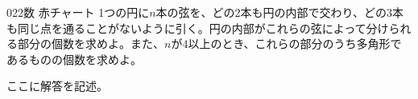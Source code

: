 \begin{prob}{022}{}{数 赤チャート}
 1つの円に$n$本の弦を、どの2本も円の内部で交わり、どの3本も同じ点を通ることがないように引く。円の内部がこれらの弦によって分けられる部分の個数を求めよ。また、$n$が4以上のとき、これらの部分のうち多角形であるものの個数を求めよ。
\end{prob}
ここに解答を記述。